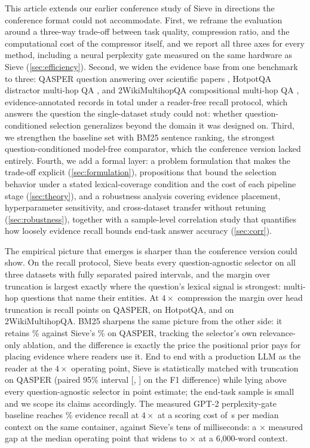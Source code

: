 \documentclass[preprint,12pt]{elsarticle}
\theoremstyle{remark}
\newcommand{\method}{Sieve}
\begin{document}
This article extends our earlier conference study of \method{} in
directions the conference format could not accommodate. First, we
reframe the evaluation around a three-way trade-off between task
quality, compression ratio, and the computational cost of the
compressor itself, and we report all three axes for every method,
including a neural perplexity gate measured on the same hardware as
\method{} (\autoref{sec:efficiency}). Second, we widen the evidence
base from one benchmark to three: QASPER question answering over
scientific papers \citep{dasigi2021qasper}, HotpotQA distractor
multi-hop QA \citep{yang2018hotpotqa}, and 2WikiMultihopQA
compositional multi-hop QA \citep{ho2020wiki}, \TotalRecords{}
evidence-annotated records in total under a reader-free recall
protocol, which answers the question the single-dataset study could
not: whether question-conditioned selection generalizes beyond the
domain it was designed on. Third, we strengthen the baseline set with
BM25 sentence ranking, the strongest question-conditioned model-free
comparator, which the conference version lacked entirely. Fourth, we
add a formal layer: a problem formulation that makes the trade-off
explicit (\autoref{sec:formulation}), propositions that bound the
selection behavior under a stated lexical-coverage condition and the
cost of each pipeline stage (\autoref{sec:theory}), and a robustness
analysis covering evidence placement, hyperparameter sensitivity, and
cross-dataset transfer without retuning (\autoref{sec:robustness}),
together with a sample-level correlation study that quantifies how
loosely evidence recall bounds end-task answer accuracy
(\autoref{sec:corr}).

The empirical picture that emerges is sharper than the conference
version could show. On the recall protocol, \method{} beats every
question-agnostic selector on all three datasets with fully separated
paired intervals, and the margin over truncation is largest exactly
where the question's lexical signal is strongest: multi-hop questions
that name their entities. At $4\times$ compression the margin over
head truncation is \PairQSH{} recall points on QASPER, \PairHSH{} on
HotpotQA, and \PairWSH{} on 2WikiMultihopQA. BM25 sharpens the same
picture from the other side: it retains \RecQBm\% against
\method{}'s \RecQSie\% on QASPER, tracking the selector's own
relevance-only ablation, and the difference is exactly the price the
positional prior pays for placing evidence where readers use it.
End to end with a production LLM as the reader at the $4\times$
operating point, \method{} is statistically matched with truncation
on QASPER (paired 95\% interval [\QAPairSHLo, \QAPairSHHi] on the F1
difference) while lying above every question-agnostic selector in
point estimate; the end-task sample is small and we scope its claims
accordingly. The measured GPT-2
perplexity-gate baseline reaches \GateRecall\% evidence recall at
$4\times$ at a scoring cost of \GateLatMedCtxS\,s per median context
on the same container, against \method{}'s tens of milliseconds: a
\GateSieRatioMed$\times$ measured gap at the median operating point
that widens to \GateSieRatioSixk$\times$ at a 6{,}000-word context.
\end{document}
